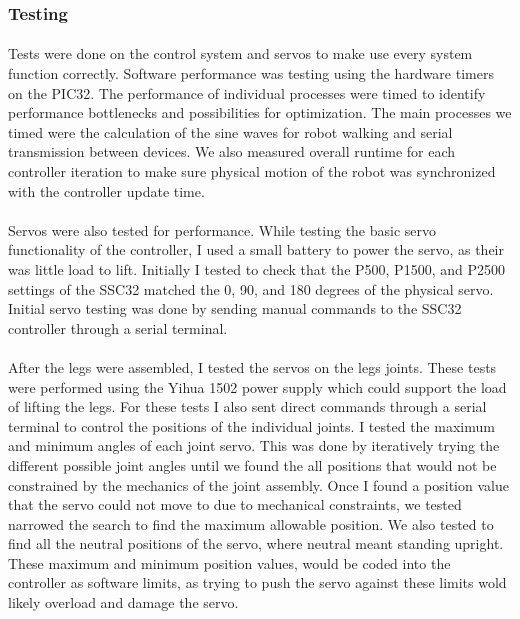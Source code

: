 \documentclass[titlepage,letterpaper,12pt]{article}
\begin{document}
\subsubsection{Testing}
\paragraph{} Tests were done on the control system and servos to make use every
system function correctly. Software performance was testing using the hardware
timers on the PIC32. The performance of individual processes were timed to
identify performance bottlenecks and possibilities for optimization. The main
processes we timed were the calculation of the sine waves for robot walking and
serial transmission between devices. We also measured overall runtime for each
controller iteration to make sure physical motion of the robot was synchronized
with the controller update time.

\paragraph{} Servos were also tested for performance. While testing the basic
servo functionality of the controller, I used a small battery to power the
servo, as their was little load to lift. Initially I tested to check that the
P500, P1500, and P2500 settings of the SSC32 matched the 0, 90, and 180 degrees
of the physical servo. Initial servo testing was done by sending manual commands
to the SSC32 controller through a serial terminal.

\paragraph{} After the legs were assembled, I tested the servos on
the legs joints. These tests were performed using the Yihua 1502 power supply
which could support the load of lifting the legs. For these tests I also sent
direct commands through a serial terminal to control the positions of the
individual joints. I tested the maximum and minimum angles of each joint servo.
This was done by iteratively trying the different possible joint angles until
we found the all positions that would not be constrained by the mechanics of the
joint assembly. Once I found a position value that the servo could not move to
due to mechanical constraints, we tested narrowed the search to find the maximum
allowable position. We also tested to find all the neutral positions of the servo,
where neutral meant standing upright. These maximum and minimum position values,
would be coded into the controller as software limits, as trying to push the
servo against these limits wold likely overload and damage the servo.
\end{document}
